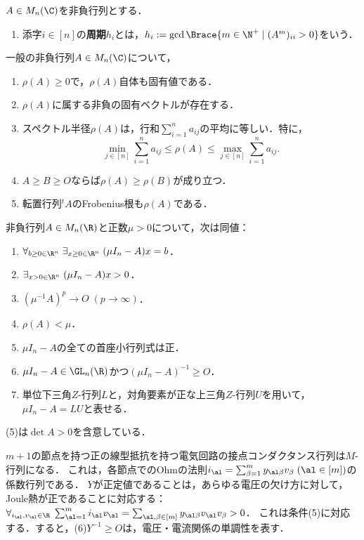 \documentclass[uplatex, dvipdfmx]{jsreport}
\begin{document}
\begin{definition}
    $A\in M_n(\C)$を非負行列とする．
    \begin{enumerate}
        \item 添字$i\in[n]$の\textbf{周期}$h_i$とは，$h_i:=\gcd\Brace{m\in\N^+\mid(A^m)_{ii}>0}$をいう．
    \end{enumerate}
\end{definition}

\begin{theorem}[非負行列のFrobenius根]
    一般の非負行列$A\in M_n(\C)$について，
    \begin{enumerate}
        \item $\rho(A)\ge0$で，$\rho(A)$自体も固有値である．
        \item $\rho(A)$に属する非負の固有ベクトルが存在する．
        \item スペクトル半径$\rho(A)$は，行和$\sum_{i=1}^na_{ij}$の平均に等しい．特に，
        \[\min_{j\in[n]}\sum_{i=1}^na_{ij}\le\rho(A)\le\max_{j\in[n]}\sum_{i=1}^na_{ij}.\]
        \item $A\ge B\ge O$ならば$\rho(A)\ge\rho(B)$が成り立つ．
        \item 転置行列${}^t\!A$のFrobenius根も$\rho(A)$である．
    \end{enumerate}
\end{theorem}

\begin{theorem}
    非負行列$A\in M_n(\R)$と正数$\mu>0$について，次は同値：
    \begin{enumerate}
        \item $\forall_{b\ge0\in\R^n}\;\exists_{x\ge0\in\R^n}\;(\mu I_n-A)x=b$．
        \item $\exists_{x>0\in\R^n}\;(\mu I_n-A)x>0$．
        \item $(\mu^{-1}A)^p\to O\;(p\to\infty)$．
        \item $\rho(A)<\mu$．
        \item $\mu I_n-A$の全ての首座小行列式は正．
        \item $\mu I_n-A\in\GL_n(\R)$かつ$(\mu I_n-A)^{-1}\ge O$．
        \item 単位下三角$Z$-行列$L$と，対角要素が正な上三角$Z$-行列$U$を用いて，$\mu I_n-A=LU$と表せる．
    \end{enumerate}
    (5)は$\det A>0$を含意している．
\end{theorem}
\begin{remarks}
    $m+1$の節点を持つ正の線型抵抗を持つ電気回路の接点コンダクタンス行列は$M$-行列になる．
    これは，各節点でのOhmの法則$i_\al=\sum_{\beta=1}^my_{\al\beta}v_\beta\;(\al\in[m])$の係数行列である．
    $Y$が正定値であることは，あらゆる電圧の欠け方に対して，Joule熱が正であることに対応する：$\forall_{i_\al,v_\al\in\R}\;\sum_{\al=1}^mi_\al v_\al=\sum_{\al,\beta\in[m]}y_{\al\beta}v_\al v_\beta>0$．
    これは条件(5)に対応する．すると，(6)$Y^{-1}\ge O$は，電圧・電流関係の単調性を表す．
\end{remarks}
\end{document}
